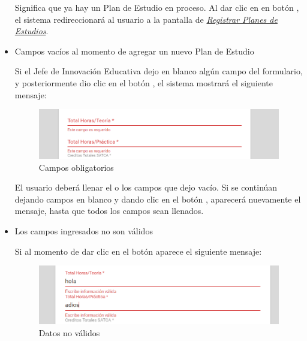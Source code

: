 \begin{itemize}
	
	Significa que ya hay un Plan de Estudio en proceso. Al dar clic en en botón , el sistema redireccionará al usuario a la pantalla de \hyperlink{registrarPE}{\textit{Registrar Planes de Estudios}}. 
	
	\item Campos vacíos al momento de agregar un nuevo Plan de Estudio
	
	Si el Jefe de Innovación Educativa dejo en blanco algún campo del formulario, y posteriormente dio clic en el botón , el sistema mostrará el siguiente mensaje:
		\begin{figure}[!hbtp]
		\centering
		\hypertarget{ms4}{\includegraphics[width=0.7\linewidth]{images/SP4-GPE/m4}}
		\caption{Campos obligatorios}
		\label{ms4}
	    \end{figure}
    
	El usuario deberá llenar el o los campos que dejo vacío. Si se continúan dejando campos en blanco y dando clic en el botón , aparecerá nuevamente el mensaje, hasta que todos los campos sean llenados.\\
	
	\newpage
	
	\item Los campos ingresados no son válidos
	
	Si al momento de dar clic en el botón  aparece el siguiente mensaje:
	\begin{figure}[!hbtp]
		\centering
		\hypertarget{ms5}{\includegraphics[width=0.7\linewidth]{images/SP4-GPE/m5}}
		\caption{Datos no válidos}
		\label{ms5}
	\end{figure}
	
\end{itemize}
